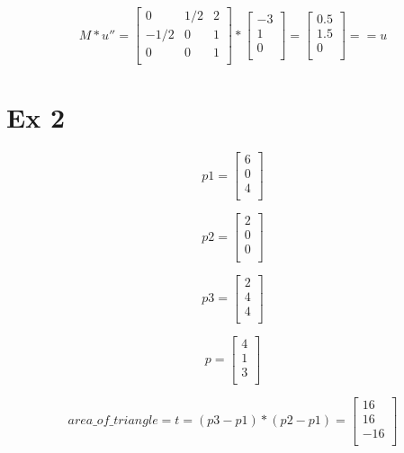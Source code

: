 \documentclass{article}
\begin{document}
\[
    M * u'' =
    \begin{bmatrix}
        0    & 1/2 & 2 \\
        -1/2 & 0   & 1 \\
        0    & 0   & 1 \\
    \end{bmatrix}
    *
    \begin{bmatrix}
        -3 \\
        1  \\
        0  \\
    \end{bmatrix}
    =
    \begin{bmatrix}
        0.5 \\
        1.5 \\
        0   \\
    \end{bmatrix}
    == u
\]



\cleardoublepage
\section*{Ex 2}

\[
    p1 = \begin{bmatrix}
        6 \\
        0 \\
        4 \\
    \end{bmatrix}
\]

\[
    p2 = \begin{bmatrix}
        2 \\
        0 \\
        0 \\
    \end{bmatrix}
\]

\[
    p3 = \begin{bmatrix}
        2 \\
        4 \\
        4 \\
    \end{bmatrix}
\]

\[
    p = \begin{bmatrix}
        4 \\
        1 \\
        3 \\
    \end{bmatrix}
\]

\[
    area\_of\_triangle = t = (p3 - p1) * (p2 - p1) =
    \begin{bmatrix}
        16  \\
        16  \\
        -16 \\
    \end{bmatrix}
\]
\end{document}
